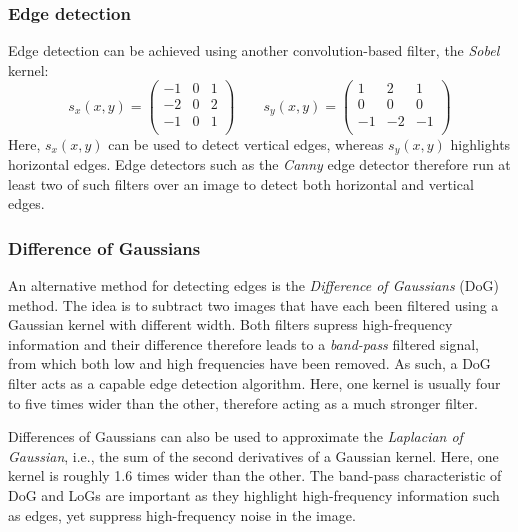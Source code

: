 \subsubsection{Edge detection}\label{sec:sobel}

Edge detection can be achieved using another convolution-based filter, the \textsl{Sobel} kernel:
\begin{equation}
s_x(x,y)=
\left(
\begin{array}{ccc}
-1 & 0 & 1\\
-2 & 0 & 2\\
-1 & 0 & 1\\
\end{array}
\right)
\qquad
s_y(x,y)=
\left(
\begin{array}{ccc}
1 & 2 & 1\\
0 & 0 & 0\\
-1 & -2 & -1\\
\end{array}
\right)
\end{equation}
Here, $s_x(x,y)$ can be used to detect vertical edges, whereas $s_y(x,y)$ highlights horizontal edges. Edge detectors such as the \textsl{Canny} edge detector therefore run at least two of such filters over an image to detect both horizontal and vertical edges.

\subsubsection{Difference of Gaussians}
\label{sec:vision:dog}

An alternative method for detecting edges is the \textsl{Difference of Gaussians} (DoG) method. The idea is to subtract two images that have each been filtered using a Gaussian kernel with different width. Both filters supress high-frequency information and their difference therefore leads to a \textsl{band-pass} filtered signal, from which both low and high frequencies have been removed. As such, a DoG filter acts as a capable edge detection algorithm. Here, one kernel is usually four to five times wider than the other, therefore acting as a much stronger filter.

Differences of Gaussians can also be used to approximate the \textsl{Laplacian of Gaussian}, i.e., the sum of the second derivatives of a Gaussian kernel. Here, one kernel is roughly 1.6 times wider than the other. The band-pass characteristic of DoG and LoGs are important as they highlight high-frequency information such as edges, yet suppress high-frequency noise in the image.

